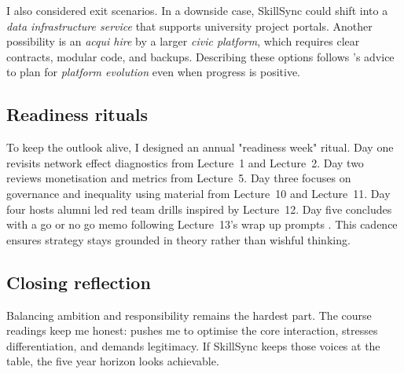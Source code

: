 I also considered exit scenarios. In a downside case, SkillSync could shift into a \textit{data infrastructure service} that supports university project portals. Another possibility is an \textit{acqui hire} by a larger \textit{civic platform}, which requires clear contracts, modular code, and backups. Describing these options follows \citet{Reillier2017}'s advice to plan for \textit{platform evolution} even when progress is positive.

\subsection*{Readiness rituals}
To keep the outlook alive, I designed an annual "readiness week" ritual. Day one revisits network effect diagnostics from Lecture~1 and Lecture~2. Day two reviews monetisation and metrics from Lecture~5. Day three focuses on governance and inequality using material from Lecture~10 and Lecture~11. Day four hosts alumni led red team drills inspired by Lecture~12. Day five concludes with a go or no go memo following Lecture~13's wrap up prompts \citep{Lecture01,Lecture02,Lecture05,Lecture10,Lecture11,Lecture12,Lecture13}. This cadence ensures strategy stays grounded in theory rather than wishful thinking.

\subsection*{Closing reflection}
Balancing ambition and responsibility remains the hardest part. The course readings keep me honest: \citet{Choudary2016} pushes me to optimise the core interaction, \citet{Porter2008} stresses differentiation, and \citet{Srnicek2017} demands legitimacy. If SkillSync keeps those voices at the table, the five year horizon looks achievable.
